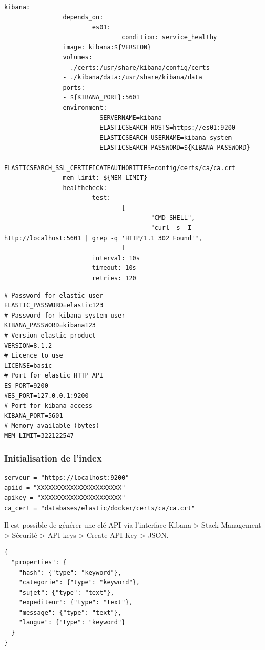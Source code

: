 \documentclass[a4paper,12pt]{article}
\begin{document}
\begin{lstlisting}[title=DockerCompose]
        kibana:
                depends_on:
                        es01:
                                condition: service_healthy
                image: kibana:${VERSION}
                volumes:
                - ./certs:/usr/share/kibana/config/certs
                - ./kibana/data:/usr/share/kibana/data
                ports:
                - ${KIBANA_PORT}:5601
                environment:
                        - SERVERNAME=kibana
                        - ELASTICSEARCH_HOSTS=https://es01:9200
                        - ELASTICSEARCH_USERNAME=kibana_system
                        - ELASTICSEARCH_PASSWORD=${KIBANA_PASSWORD}
                        - ELASTICSEARCH_SSL_CERTIFICATEAUTHORITIES=config/certs/ca/ca.crt
                mem_limit: ${MEM_LIMIT}
                healthcheck:
                        test:
                                [
                                        "CMD-SHELL",
                                        "curl -s -I http://localhost:5601 | grep -q 'HTTP/1.1 302 Found'",
                                ]
                        interval: 10s
                        timeout: 10s
                        retries: 120
			\end{lstlisting}
			
			\begin{lstlisting}[title=Fichier d'environnement]
# Password for elastic user
ELASTIC_PASSWORD=elastic123
# Password for kibana_system user
KIBANA_PASSWORD=kibana123
# Version elastic product
VERSION=8.1.2
# Licence to use
LICENSE=basic
# Port for elastic HTTP API
ES_PORT=9200
#ES_PORT=127.0.0.1:9200
# Port for kibana access
KIBANA_PORT=5601
# Memory available (bytes)
MEM_LIMIT=322122547
			\end{lstlisting}

		\subsubsection{Initialisation de l'index}
		
			\begin{lstlisting}[title=Exemples de secrets]
serveur = "https://localhost:9200"
apiid = "XXXXXXXXXXXXXXXXXXXXXXX"
apikey = "XXXXXXXXXXXXXXXXXXXXXX"
ca_cert = "databases/elastic/docker/certs/ca/ca.crt"
			\end{lstlisting}
			Il est possible de générer une clé API via l'interface Kibana > Stack Management > Sécurité > API keys > Create API Key > JSON. 
			
			\begin{lstlisting}[title=Mapping]
{
  "properties": {
    "hash": {"type": "keyword"},
    "categorie": {"type": "keyword"},
    "sujet": {"type": "text"},
    "expediteur": {"type": "text"},
    "message": {"type": "text"},
    "langue": {"type": "keyword"}
  }
}
			\end{lstlisting}
			
\end{document}

